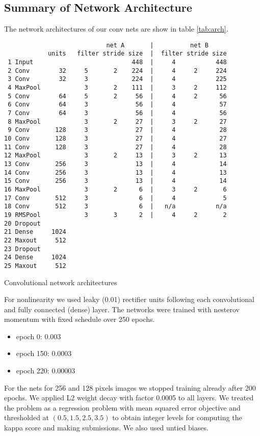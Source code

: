 \documentclass[12pt,a4paper]{scrartcl}
\begin{document}
\subsection{Summary of Network Architecture}
The network architectures of our conv nets are show in table \ref{tab:arch}.
\begin{table}[ht]
{\small
\begin{verbatim}
                            net A       |          net B
            units   filter stride size  |  filter stride size
 1 Input                           448  |     4           448
 2 Conv        32     5       2    224  |     4     2     224
 3 Conv        32     3            224  |     4           225 
 4 MaxPool            3       2    111  |     3     2     112 
 5 Conv        64     5       2     56  |     4     2      56
 6 Conv        64     3             56  |     4            57
 7 Conv        64     3             56  |     4            56
 8 MaxPool            3       2     27  |     3     2      27
 9 Conv       128     3             27  |     4            28
10 Conv       128     3             27  |     4            27
11 Conv       128     3             27  |     4            28
12 MaxPool            3       2     13  |     3     2      13
13 Conv       256     3             13  |     4            14
14 Conv       256     3             13  |     4            13
15 Conv       256     3             13  |     4            14
16 MaxPool            3       2      6  |     3     2       6
17 Conv       512     3              6  |     4             5
18 Conv       512     3              6  |   n/a           n/a
19 RMSPool            3       3      2  |     4     2       2
20 Dropout
21 Dense     1024
22 Maxout     512
23 Dropout
24 Dense     1024
25 Maxout     512
\end{verbatim}
}
\caption{Convolutional network architectures}
\label{tab:arch}
\end{table}

For nonlinearity we used leaky (0.01) rectifier units following each convolutional and fully connected (dense) layer. The networks were trained with nesterov momentum with fixed schedule over 250 epochs.
  \begin{itemize}
  \item
    epoch 0: 0.003
  \item
    epoch 150: 0.0003
  \item
    epoch 220: 0.00003
  \end{itemize}
For the nets for 256 and 128 pixels images we stopped training
already after 200 epochs. We applied L2 weight decay with factor 0.0005 to all layers. We treated the problem as a regression problem with mean squared error  objective and thresholded at $(0.5, 1.5, 2.5, 3.5)$ to obtain integer levels for computing the kappa score and making submissions. We also used untied biases.
%
\end{document}
